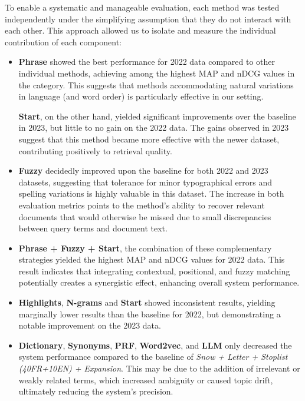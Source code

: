 To enable a systematic and manageable evaluation, each method was tested independently under the simplifying assumption that they do not interact with each other. This approach allowed us to isolate and measure the individual contribution of each component:
\begin{itemize}
\item\textbf{Phrase} showed the best performance for 2022 data compared to other individual methods, achieving among the highest MAP and nDCG values in the category. This suggests that methods accommodating natural variations in language (and word order) is particularly effective in our setting.

\textbf{Start}, on the other hand, yielded significant improvements over the baseline in 2023, but little to no gain on the 2022 data. The gains observed in 2023 suggest that this method became more effective with the newer dataset, contributing positively to retrieval quality.

\item\textbf{Fuzzy} decidedly improved upon the baseline for both 2022 and 2023 datasets, suggesting that tolerance for minor typographical errors and spelling variations is highly valuable in this dataset. The increase in both evaluation metrics points to the method's ability to recover relevant documents that would otherwise be missed due to small discrepancies between query terms and document text.

\item\textbf{Phrase + Fuzzy + Start}, the combination of these complementary strategies yielded the highest MAP and nDCG values for 2022 data. This result indicates that integrating contextual, positional, and fuzzy matching potentially creates a synergistic effect, enhancing overall system performance.

\item\textbf{Highlights}, \textbf{N-grams} and \textbf{Start} showed inconsistent results, yielding marginally lower results than the baseline for 2022, but demonstrating a notable improvement on the 2023 data.

\item\textbf{Dictionary}, \textbf{Synonyms}, \textbf{PRF}, \textbf{Word2vec}, and \textbf{LLM} only decreased the system performance compared to the baseline of \textit{Snow + Letter + Stoplist (40FR+10EN) + Expansion}. This may be due to the addition of irrelevant or weakly related terms, which increased ambiguity or caused topic drift, ultimately reducing the system's precision.

\end{itemize}

